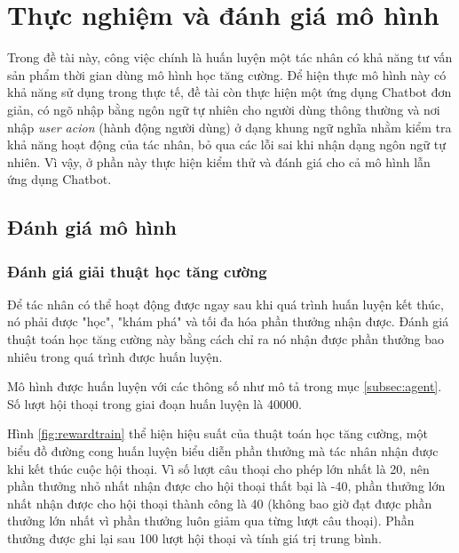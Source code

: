 \chapter {Thực nghiệm và đánh giá mô hình}

Trong đề tài này, công việc chính là huấn luyện một tác nhân có khả năng tư vấn sản phẩm thời gian dùng mô hình học tăng cường. Để hiện thực mô hình này có khả năng sử dụng trong thực tế, đề tài còn thực hiện một ứng dụng Chatbot đơn giản, có ngõ nhập bằng ngôn ngữ tự nhiên cho người dùng thông thường và nơi nhập \textit{user acion} (hành động người dùng) ở dạng khung ngữ nghĩa nhằm kiểm tra khả năng hoạt động của tác nhân, bỏ qua các lỗi sai khi nhận dạng ngôn ngữ tự nhiên. Vì vậy, ở phần này thực hiện kiểm thử và đánh giá cho cả mô hình lẫn ứng dụng Chatbot.

\section{Đánh giá mô hình}
\subsection{Đánh giá giải thuật học tăng cường}
Để tác nhân có thể hoạt động được ngay sau khi quá trình huấn luyện kết thúc, nó phải được "học", "khám phá" và tối đa hóa phần thưởng nhận được. Đánh giá thuật toán học tăng cường này bằng cách chỉ ra nó nhận được phần thưởng bao nhiêu trong quá trình được huấn luyện. 

Mô hình được huấn luyện với các thông số như mô tả trong mục \ref{subsec:agent}. Số lượt hội thoại trong giai đoạn huấn luyện là 40000.

Hình \ref{fig:rewardtrain} thể hiện hiệu suất của thuật toán học tăng cường, một biểu đồ đường cong huấn luyện biểu diễn phần thưởng mà tác nhân nhận được khi kết thúc cuộc hội thoại. Vì số lượt câu thoại cho phép lớn nhất là 20, nên phần thưởng nhỏ nhất nhận được cho hội thoại thất bại là -40, phần thưởng lớn nhất nhận được cho hội thoại thành công là 40 (không bao giờ đạt được phần thưởng lớn nhất vì phần thưởng luôn giảm qua từng lượt câu thoại). Phần thưởng được ghi lại sau 100 lượt hội thoại và tính giá trị trung bình.

\clearpage

